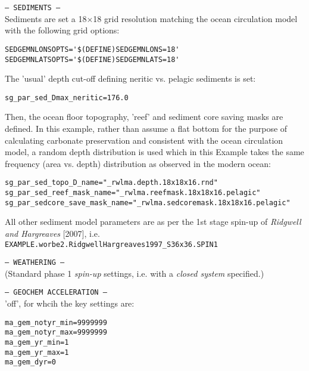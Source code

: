 \documentclass[10pt,twoside]{article}
\begin{document}
\begin{compactitem}

        \item \texttt{--- SEDIMENTS ---}
        \\ Sediments are set a  18\(\times\)18 grid resolution matching the ocean circulation model with the following grid options:
                        \vspace{-5pt}\begin{verbatim}
SEDGEMNLONSOPTS='$(DEFINE)SEDGEMNLONS=18'
SEDGEMNLATSOPTS='$(DEFINE)SEDGEMNLATS=18'
                \end{verbatim}\vspace{-5pt}
                The 'usual' depth cut-off defining neritic vs. pelagic sediments is set:
                        \vspace{-5pt}\begin{verbatim}
sg_par_sed_Dmax_neritic=176.0
                \end{verbatim}\vspace{-5pt}
                Then, the ocean floor topography, 'reef' and sediment core saving masks
are defined. In this example, rather than assume a flat bottom for the purpose of calculating carbonate preservation and consistent with the ocean circulation model, a random depth distribution is used which in this Example takes the same frequency (area vs. depth) distribution as observed in the modern ocean:                        \vspace{-5pt}\begin{verbatim}
sg_par_sed_topo_D_name="_rwlma.depth.18x18x16.rnd"
sg_par_sed_reef_mask_name="_rwlma.reefmask.18x18x16.pelagic"
sg_par_sedcore_save_mask_name="_rwlma.sedcoremask.18x18x16.pelagic"
                \end{verbatim}\vspace{-5pt}
All other sediment model parameters are as per the 1st stage spin-up of \textit{Ridgwell and Hargreaves} [2007], i.e.
\\ \texttt{EXAMPLE.worbe2.RidgwellHargreaves1997\_S36x36.SPIN1}
                
        \item \texttt{--- WEATHERING ---}
        \\ (Standard phase 1 \textit{spin-up} settings, i.e. with a \textit{closed system} specified.)
        
        \item \texttt{--- GEOCHEM ACCELERATION ---}
        \\ 'off', for whcih the key settings are:
                        \vspace{-5pt}\begin{verbatim}
ma_gem_notyr_min=9999999
ma_gem_notyr_max=9999999
ma_gem_yr_min=1
ma_gem_yr_max=1
ma_gem_dyr=0
                \end{verbatim}\vspace{-5pt}
        

\end{compactitem}
\end{document}
